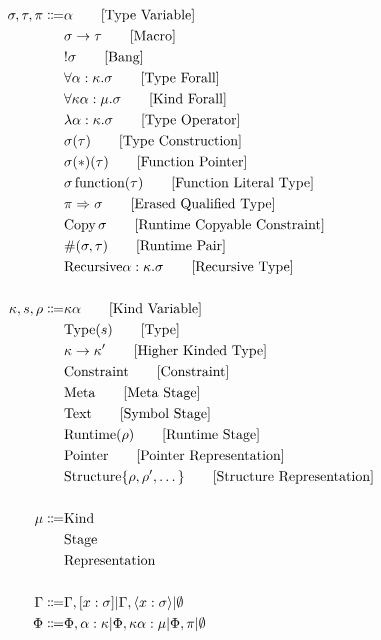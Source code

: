 \documentclass {article}
\begin{document}
\begin{align*}
\sigma, \tau, \pi \Coloneqq & \alpha \tag* {[Type Variable]}\\
& \sigma \to \tau \tag*{[Macro]}\\
& !\sigma \tag*{[Bang]} \\
& \forall \alpha : \kappa. \sigma \tag*{[Type Forall]}\\ 
& \forall \kappa \alpha : \mu. \sigma \tag*{[Kind Forall]}\\
& \lambda \alpha : \kappa. \sigma \tag*{[Type Operator]} \\
& \sigma (\tau) \tag*{[Type Construction]} \\
& \sigma (*) (\tau) \tag*{[Function Pointer]}\\
& \sigma \, \text{function}(\tau) \tag*{[Function Literal Type]} \\
& \pi \Rightarrow \sigma \tag*{[Erased Qualified Type]} \\
& \text{Copy} \, \sigma \tag*{[Runtime Copyable Constraint]} \\
& \#(\sigma, \tau) \tag*{[Runtime Pair]} \\
& \text{Recursive} \alpha : \kappa. \sigma \tag*{[Recursive Type]} \\
\\
\kappa, s, \rho \Coloneqq &  \kappa \alpha \tag*{[Kind Variable]} \\
& \text{Type} (s) \tag*{[Type]} \\
& \kappa \to \kappa' \tag*{[Higher Kinded Type]} \\
& \text{Constraint} \tag*{[Constraint]} \\
& \text{Meta} \tag*{[Meta Stage]}\\
& \text{Text} \tag*{[Symbol Stage]} \\
& \text{Runtime} (\rho) \tag*{[Runtime Stage]}\\
& \text{Pointer} \tag*{[Pointer Representation]}\\
& \text{Structure} \{ \rho, \rho', \dots \} \tag*{[Structure Representation]} \\
\\
\mu \Coloneqq & \text{Kind} \\
& \text{Stage} \\
& \text{Representation} \\
\\
\Gamma \Coloneqq & \Gamma, [x : \sigma] | \Gamma, \langle x : \sigma \rangle | \emptyset \\
\Phi \Coloneqq & \Phi, \alpha : \kappa | \Phi, \kappa \alpha : \mu | \Phi, \pi|  \emptyset \\
\end{align*}
\end{document}
